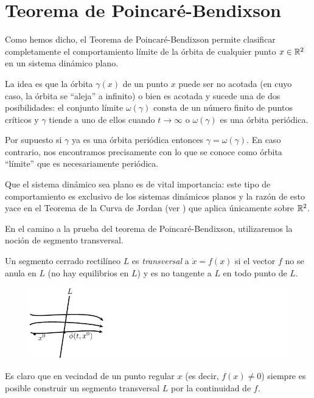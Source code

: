 \section{Teorema de Poincaré-Bendixson}

Como hemos dicho, el Teorema de Poincaré-Bendixson permite clasificar completamente el comportamiento límite de la órbita de cualquier punto $x \in {\ensuremath{\mathbb{R}}}^2$ en un sistema dinámico plano.

La idea es que la órbita $\gamma(x)$ de un punto $x$ puede ser no acotada (en cuyo caso, la órbita se ``aleja'' a infinito) o bien es acotada y sucede una de dos posibilidades: el conjunto límite $\omega(\gamma)$ consta de un número finito de puntos críticos y $\gamma$ tiende a uno de ellos cuando $t \to \infty$ o $\omega(\gamma)$ es una órbita periódica.

Por supuesto si $\gamma$ ya es una órbita periódica entonces $\gamma = \omega(\gamma)$. En caso contrario, nos encontramos precisamente con lo que se conoce como órbita ``límite'' que es necesariamente periódica.

Que el sistema dinámico sea plano es de vital importancia: este tipo de comportamiento es exclusivo de los sistemas dinámicos planos y la razón de esto yace en el Teorema de la Curva de Jordan (ver \cite{fleming,spivak}) que aplica únicamente sobre ${\mathbb{R}}^2$.

En el camino a la prueba del teorema de Poincaré-Bendixson, utilizaremos la noción de segmento transversal.

\begin{definition}Un segmento cerrado rectilíneo $L$ es \emph{transversal} a $\dot{x} = f(x)$ si el vector $f$ no se anula en $L$ (no hay equilibrios en $L$) y es no tangente a $L$ en todo punto de $L$.
\end{definition}

\begin{figure}[h] \centering
    \includegraphics[scale=1.1]{figures/transversal.pdf}
\end{figure}

Es claro que en vecindad de un punto regular $x$ (es decir, $f(x) \neq 0$) siempre es posible construir un segmento transversal $L$ por la continuidad de $f$.

